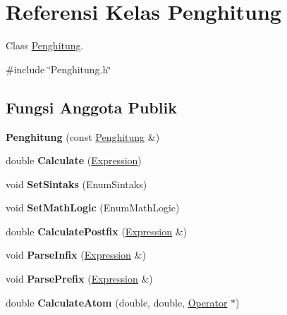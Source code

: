 \hypertarget{classPenghitung}{}\section{Referensi Kelas Penghitung}
\label{classPenghitung}


Class \hyperlink{classPenghitung}{Penghitung}.  




{\ttfamily \#include \char`\"{}Penghitung.\+h\char`\"{}}

\subsection*{Fungsi Anggota Publik}
\begin{DoxyCompactItemize}
\item 
\hypertarget{classPenghitung_a131a947d8e8271a40c06617b537719bf}{}{\bfseries Penghitung} (const \hyperlink{classPenghitung}{Penghitung} \&)\label{classPenghitung_a131a947d8e8271a40c06617b537719bf}

\item 
\hypertarget{classPenghitung_a89d5dbc2ba4990d20cbd23b8dc36e5d8}{}double {\bfseries Calculate} (\hyperlink{classExpression}{Expression})\label{classPenghitung_a89d5dbc2ba4990d20cbd23b8dc36e5d8}

\item 
\hypertarget{classPenghitung_aa47317ed3b4985c8fb59ac2695db4c56}{}void {\bfseries Set\+Sintaks} (Enum\+Sintaks)\label{classPenghitung_aa47317ed3b4985c8fb59ac2695db4c56}

\item 
\hypertarget{classPenghitung_ac810fdb8a3c14ce1eada51519830d624}{}void {\bfseries Set\+Math\+Logic} (Enum\+Math\+Logic)\label{classPenghitung_ac810fdb8a3c14ce1eada51519830d624}

\item 
\hypertarget{classPenghitung_a341680e8cf1b3d885bcf033595f124eb}{}double {\bfseries Calculate\+Postfix} (\hyperlink{classExpression}{Expression} \&)\label{classPenghitung_a341680e8cf1b3d885bcf033595f124eb}

\item 
\hypertarget{classPenghitung_a9a79a76c40718775b4e7bb0da7e398b8}{}void {\bfseries Parse\+Infix} (\hyperlink{classExpression}{Expression} \&)\label{classPenghitung_a9a79a76c40718775b4e7bb0da7e398b8}

\item 
\hypertarget{classPenghitung_acda85405d8d4a66e9b32d79d493c36d6}{}void {\bfseries Parse\+Prefix} (\hyperlink{classExpression}{Expression} \&)\label{classPenghitung_acda85405d8d4a66e9b32d79d493c36d6}

\item 
\hypertarget{classPenghitung_a286c8a27a702a9b07bbb4b226e91c815}{}double {\bfseries Calculate\+Atom} (double, double, \hyperlink{classOperator}{Operator} $\ast$)\label{classPenghitung_a286c8a27a702a9b07bbb4b226e91c815}

\end{DoxyCompactItemize}


